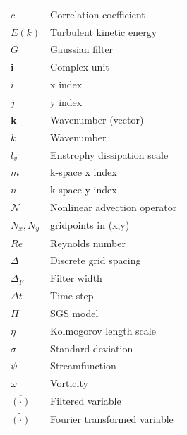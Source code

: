 \documentclass[conf]{new-aiaa}
\begin{document}
{\renewcommand\arraystretch{1.0}
\noindent\begin{longtable*}{@{}l @{\quad=\quad} l@{}}
$c$ & Correlation coefficient\\
$E(k)$ & Turbulent kinetic energy\\
$G$ & Gaussian filter \\
$\mathbf{i}$ & Complex unit \\
$i$  & x index \\
$j$  & y index \\
$\mathbf{k}$  & Wavenumber (vector) \\
$k$  & Wavenumber \\
$l_{v}$ & Enstrophy dissipation scale \\
$m$ & k-space x index \\
$n$ & k-space y index \\
$\mathcal{N}$ & Nonlinear advection operator \\
$N_{x},N_{y}$ & gridpoints in (x,y) \\
$Re$ & Reynolds number \\
$\Delta$ & Discrete grid spacing\\
$\Delta_{F}$ & Filter width\\
$\Delta t$ & Time step \\
$\Pi$ & SGS model \\
$\eta$ & Kolmogorov length scale\\
$\sigma$ & Standard deviation \\
$\psi$ & Streamfunction \\
$\omega$ & Vorticity \\
$\overline{(\cdot)}$ & Filtered variable\\
$\tilde{(\cdot)}$ & Fourier transformed variable
\end{longtable*}}
\end{document}
